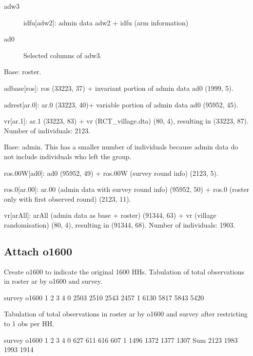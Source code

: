 \begin{description}
\vspace{1.0ex}\setlength{\itemsep}{1.0ex}\setlength{\baselineskip}{12pt}
\item[adw3]	idfu[adw2]: admin data \textsf{adw2} + \textsf{idfu} (arm information)
\item[ad0]	Selected columns of adw3.
\end{description}
Base: roster.
\begin{description}
\vspace{1.0ex}\setlength{\itemsep}{1.0ex}\setlength{\baselineskip}{12pt}
\item[ar.0]	adbase[ros]: \textsf{ros} (33223, 37) + invariant portion of admin data \textsf{ad0} (1999, 5).
\item[ar.1]	adrest[ar.0]: \textsf{ar.0} (33223, 40)+ variable portion of admin data \textsf{ad0} (95952, 45).
\item[ar] vr[ar.1]: \textsf{ar.1} (33223, 83) + \textsf{vr} (RCT\_village.dta) (80, 4), resulting in (33223, 87). Number of individuals: 2123.
\end{description}
Base: admin. This has a smaller number of individuals because admin data do not include individuals who left the group.
\begin{description}
\vspace{1.0ex}\setlength{\itemsep}{1.0ex}\setlength{\baselineskip}{12pt}
\item[ar.00]	ros.00W[ad0]: \textsf{ad0} (95952, 49) + \textsf{ros.00W} (survey round info) (2123, 5).
\item[arAll]	ros.0[ar.00]: \textsf{ar.00} (admin data with survey round info) (95952, 50) + \textsf{ros.0} (roster only with first observed round) (2123, 11).
\item[arA] vr[arAll]: \textsf{arAll} (admin data as base + roster) (91344, 63) + \textsf{vr} (village randomisation) (80, 4), resulting in (91344, 68). Number of individuals: 1903.
\end{description}


\subsection{Attach \textsf{o1600}}


Create \textsf{o1600} to indicate the original 1600 HHs. Tabulation of total observations in roster \textsf{ar} by \textsf{o1600} and \textsf{survey}.
\begin{Schunk}
\begin{Soutput}
     survey
o1600    1    2    3    4
    0 2503 2510 2543 2457
    1 6130 5817 5843 5420
\end{Soutput}
\end{Schunk}
Tabulation of total observations in roster \textsf{ar} by \textsf{o1600} and \textsf{survey} after restricting to 1 obs per HH.
\begin{Schunk}
\begin{Soutput}
     survey
o1600    1    2    3    4
  0    627  611  616  607
  1   1496 1372 1377 1307
  Sum 2123 1983 1993 1914
\end{Soutput}
\end{Schunk}

